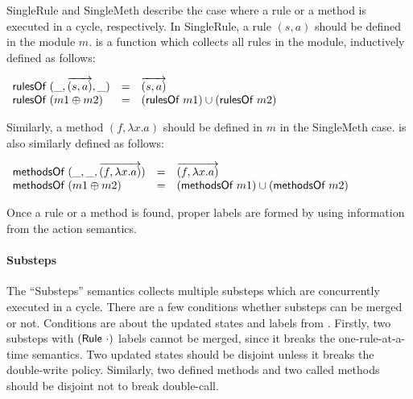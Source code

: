 SingleRule and SingleMeth describe the case where a rule or a method
is executed in a cycle, respectively. In SingleRule, a rule $(s, a)$
should be defined in the module $m$.  is a function which
collects all rules in the module, inductively defined as follows:
\begin{definition}
  \label{def-rulesofm}
  \mbox{}
  \begin{center}
    \begin{math}
      \begin{array}{lcl}
        \textsf{rulesOf}\ (\_, \overrightarrow{(s, a)}, \_) & = & \overrightarrow{(s, a)}\\
        \textsf{rulesOf}\ (m1 \oplus m2) & = & (\textsf{rulesOf}\ m1) \cup (\textsf{rulesOf}\ m2)\\
      \end{array}
    \end{math}
  \end{center}
\end{definition}
Similarly, a method $(f, \lambda x.a)$ should be defined in $m$ in the
SingleMeth case.  is also similarly defined as follows:
\begin{definition}
  \label{def-methsof}
  \mbox{}
  \begin{center}
    \begin{math}
      \begin{array}{lcl}
        \textsf{methodsOf}\ (\_, \_, \overrightarrow{(f, \lambda x.a)}) & = & \overrightarrow{(f, \lambda x.a)} \\
        \textsf{methodsOf}\ (m1 \oplus m2) & = & (\textsf{methodsOf}\ m1) \cup (\textsf{methodsOf}\ m2)\\
      \end{array}
    \end{math}
  \end{center}
\end{definition}
Once a rule or a method is found, proper labels are formed by using
information from the action semantics.

\paragraph{Substeps}
The ``Substeps'' semantics collects multiple substeps which are
concurrently executed in a cycle. There are a few conditions whether
substeps can be merged or not. Conditions are about the updated states
and labels from \Substep{}. Firstly, two substeps with
$(\textsf{Rule}\ \cdot)$ labels cannot be merged, since it breaks the
one-rule-at-a-time semantics. Two updated states should be disjoint
unless it breaks the double-write policy. Similarly, two defined
methods and two called methods should be disjoint not to break
double-call.

